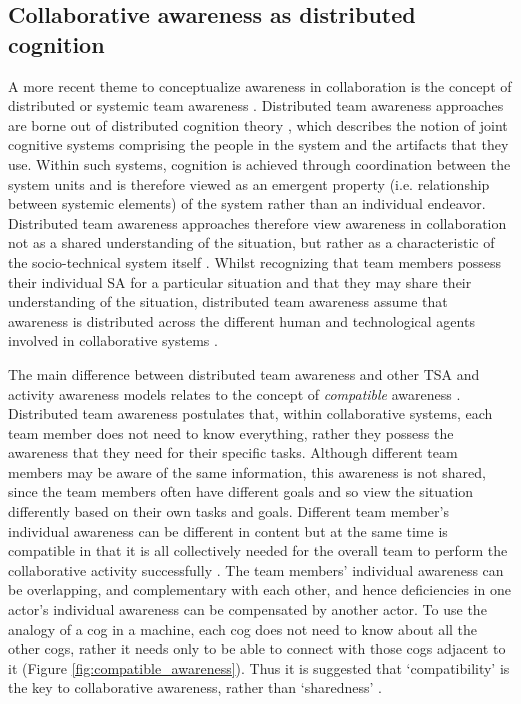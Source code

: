 \subsection{Collaborative awareness as distributed cognition} %
\label{sub:distributed_team_awareness}
A more recent theme to conceptualize awareness in collaboration is the concept of distributed or systemic team awareness \cite{Stanton2009,artman1998situation}. Distributed team awareness approaches are borne out of distributed cognition theory \cite{hutchins1995cognition}, which describes the notion of joint cognitive systems comprising the people in the system and the artifacts that they use. Within such systems, cognition is achieved through coordination between the system units \cite{artman1998situation} and is therefore viewed as an emergent property (i.e. relationship between systemic elements) of the system rather than an individual endeavor. Distributed team awareness approaches therefore view awareness in collaboration not as a shared understanding of the situation, but rather as a characteristic of the socio-technical system itself \cite{artman1998situation}. Whilst recognizing that team members possess their individual SA for a particular situation and that they may share their understanding of the situation, distributed team awareness assume that awareness is distributed across the different human and technological agents involved in collaborative systems \cite{Stanton2009}.

The main difference between distributed team awareness and other TSA and activity awareness models relates to the concept of \emph{compatible} awareness \cite{Stanton2009}. Distributed team awareness postulates that, within collaborative systems, each team member does not need to know everything, rather they possess the awareness that they need for their specific tasks. Although different team members may be aware of the same information, this awareness is not shared, since the team members often have different goals and so view the situation differently based on their own tasks and goals. Different team member's individual awareness can be different in content but at the same time is compatible in that it is all collectively needed for the overall team to perform the collaborative activity successfully \cite{Salmon2010}. The team members' individual awareness can be overlapping, and complementary with each other, and hence deficiencies in one actor's individual awareness can be compensated by another actor. To use the analogy of a cog in a machine, each cog does not need to know about all the other cogs, rather it needs only to be able to connect with those cogs adjacent to it (Figure \ref{fig:compatible_awareness}). Thus it is suggested that `compatibility' is the key to collaborative awareness, rather than `sharedness' \cite{Salmon2008a}.

